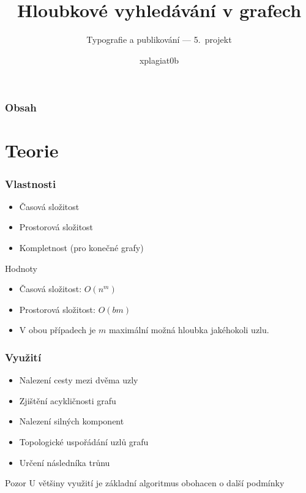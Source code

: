 \documentclass{beamer}
\title{Hloubkové vyhledávání v grafech}
\subtitle{Typografie a publikování --- 5.\, projekt}
\author{xplagiat0b}
\begin{document}
\frame{\titlepage}

\begin{frame}
    \frametitle{Obsah}
    \tableofcontents
\end{frame}

\section{Teorie}

\begin{frame}
    \frametitle{Vlastnosti}

    \begin{itemize}
        \item Časová složitost
        \item Prostorová složitost
        \item Kompletnost (pro konečné grafy)
    \end{itemize}

    \begin{block}{Hodnoty}
        \begin{itemize}
            \item Časová složitost: $O(n^m)$
            \item Prostorová složitost: $O(bm)$
            \item V obou případech je $m$ maximální možná hloubka jakéhokoli uzlu.
        \end{itemize}

    \end{block}

\end{frame}

\begin{frame}
    \frametitle{Využití}
    \begin{itemize}
        \item Nalezení cesty mezi dvěma uzly
        \item Zjištění acykličnosti grafu
        \item Nalezení silných komponent
        \item Topologické uspořádání uzlů grafu
        \item Určení následníka trůnu
    \end{itemize}

    \begin{alertblock}{Pozor}
        U většiny využití je základní algoritmus obohacen o další podmínky
    \end{alertblock}


\end{frame}
\end{document}
